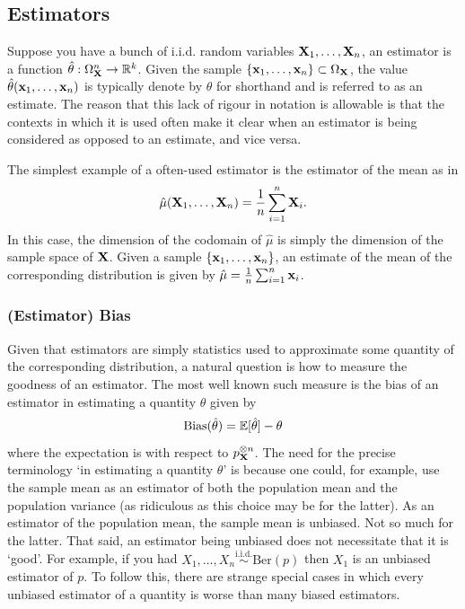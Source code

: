 \documentclass[11pt]{article}
\begin{document}
\begin{appendices}
\subsection{Estimators}
Suppose you have a bunch of i.i.d. random variables $\mathbf{X}_1,\dots,\mathbf{X}_n$, an estimator is a function $\hat{\theta}:\Omega_{\mathbf{X}}^n\to\mathbb{R}^k$. Given the sample $\{\mathbf{x}_1,\dots,\mathbf{x}_n\}\subset\Omega_{\mathbf{X}}$, the value $\hat{\theta}(\mathbf{x}_1,\dots,\mathbf{x}_n)$ is typically denote by $\hat{\theta}$ for shorthand and is referred to as an estimate. The reason that this lack of rigour in notation is allowable is that the contexts in which it is used often make it clear when an estimator is being considered as opposed to an estimate, and vice versa.

The simplest example of a often-used estimator is the estimator of the mean as in
$$
\hat{\mu}(\mathbf{X}_1,\dots,\mathbf{X}_n)
=
\frac{1}{n}\sum_{i=1}^n \mathbf{X}_i.
$$
In this case, the dimension of the codomain of $\hat{\mu}$ is simply the dimension of the sample space of $\mathbf{X}$. Given a sample $\{\mathbf{x}_1,\dots,\mathbf{x}_n\}$, an estimate of the mean of the corresponding distribution is given by $\hat{\mu}=\frac{1}{n}\sum_{i=1}^n\mathbf{x}_i$.

\subsubsection{(Estimator) Bias}
Given that estimators are simply statistics used to approximate some quantity of the corresponding distribution, a natural question is how to measure the goodness of an estimator. The most well known such measure is the bias of an estimator in estimating a quantity $\theta$ given by
$$
\text{Bias}(\hat{\theta})
=
\mathbb{E}[\hat{\theta}]-\theta
$$
where the expectation is with respect to $p_{\mathbf{X}}^{{\otimes}n}$. The need for the precise terminology `in estimating a quantity $\theta$' is because one could, for example, use the sample mean as an estimator of both the population mean and the population variance (as ridiculous as this choice may be for the latter). As an estimator of the population mean, the sample mean is unbiased. Not so much for the latter. That said, an estimator being unbiased does not necessitate that it is `good'. For example, if you had $X_1,\dots,X_n\overset{\text{i.i.d.}}{\sim}\text{Ber}(p)$ then $X_1$ is an unbiased estimator of $p$. To follow this, there are strange special cases in which every unbiased estimator of a quantity is worse than many biased estimators.


\end{appendices}
\end{document}
